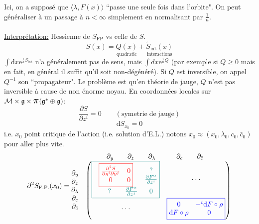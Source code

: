 \documentclass[a4paper,11pt]{article}
\renewcommand{\d}{{\mathrm{d}}}
\newcommand{\e}{{\mathrm{e}}}
\newcommand{\dr}[2]{\frac{\partial {#1}}{\partial{#2}}}
\newcommand{\ppi}{{\mathlarger{\mathlarger{\mathlarger{\pi}}}}}
\begin{document}
Ici, on a supposé que $\langle\lambda, F(x)\rangle$ ``passe une seule fois dans l'orbite". On peut généraliser à un passage à $n<\infty$ simplement en normalisant par $\frac1n$.\\\\
\underline{Interprétation:} Hessienne de $S_\mathrm{FP}$ vs celle de $S$.
$$S(x) = \underset{\mathrm{quadratic}}{Q(x)}+ \underset{\mathrm{interactions}}{\tilde S_\mathrm{int}(x)}$$
$\int \d x \e^{\frac i\hbar S_\mathrm{int}}$ n'a généralement pas de sens, mais $\int d x \e^{\frac i\hbar Q}$ (par exemple si $Q\geq 0$ mais en fait, en général il suffit qu'il soit non-dégénéré). Si $Q$ est inversible, on appel $Q^{-1}$ son ``propagateur". Le problème est qu'en théorie de jauge, $Q$ n'est pas inversible à cause de non énorme noyau. En coordonnées locales sur $\mathcal M\times\mathfrak g\times\ppi(\mathfrak g^*\oplus\mathfrak g)$:
$$\dr S{z^i}=0\quad\quad(\mathrm{symetrie}\;\mathrm{de}\;\mathrm{jauge})$$
$$\boxed{\d S_{x_0}=0}$$
i.e. $x_0$ point critique de l'action (i.e. solution d'E.L.) notons $x_0\approx(x_0,\lambda_0,c_0,\bar c_0)$ pour aller plus vite.
$$\partial^2 S_{\mathrm{F}.\mathrm{P}.}(x_0) =
\begin{matrix} & \partial_y \qquad\partial_z \qquad\partial_\lambda \quad\qquad\partial_c \qquad\partial_{\bar c}\quad\\ 
	\begin{matrix} \partial_y \\\partial_z\\\partial_\lambda\\\partial_c\\\partial_{\bar c}\end{matrix} &\left(\begin{matrix}\color{teal}\boxed{\begin{matrix}\color{red}\boxed{\begin{matrix}
	\frac{\partial^2 S}{\partial y^i \partial y^j} & 0\\
	0 & 0
\end{matrix}} & \begin{matrix}
	? \\ \frac{\partial F^\alpha}{\partial z^i}
\end{matrix}\\
\quad\quad ? \quad \quad\frac{\partial F^\alpha}{\partial z^j} & 0\end{matrix}} & \cdot\cdot\cdot\\
\cdot\cdot\cdot & \color{blue}\boxed{\begin{matrix}
0 & - ^t\d F\circ\rho\\ \d F\circ\rho & 0
\end{matrix}}\end{matrix}\right)\end{matrix}$$
\end{document}
